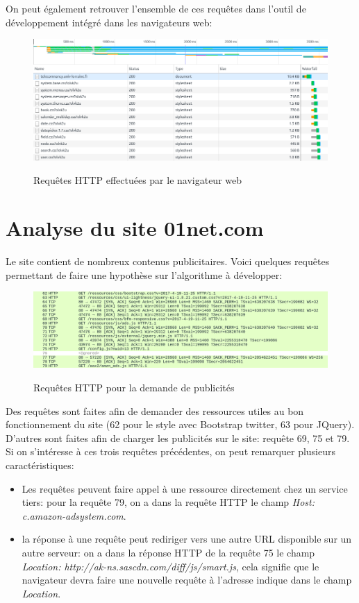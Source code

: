 \documentclass[a4paper,11pt, oneside]{book}
\def\widthImage{1}
\begin{document}
		On peut également retrouver l'ensemble de ces requêtes dans l'outil de développement intégré dans les navigateurs web:

		\begin{figure} [htbp]
			\centering
			\includegraphics[width=\widthImage\textwidth]{3.png}\\
			\caption{Requêtes HTTP effectuées par le navigateur web}
		\end{figure}


	\clearpage
	\section{Analyse du site 01net.com}
		Le site contient de nombreux contenus publicitaires. Voici quelques requêtes permettant
		de faire une hypothèse sur l'algorithme à développer:

		\begin{figure} [htbp]
			\centering
			\includegraphics[width=\widthImage\textwidth]{4.png}\\
			\caption{Requêtes HTTP pour la demande de publicités}
		\end{figure}

		Des requêtes sont faites afin de demander des ressources utiles au bon fonctionnement du site (62 pour le style avec Bootstrap twitter, 63 pour JQuery).
		D'autres sont faites afin de charger les publicités sur le site: requête 69, 75 et 79.
		Si on s'intéresse à ces trois requêtes précédentes, on peut remarquer plusieurs caractéristiques:
		\begin{itemize}
			\item Les requêtes peuvent faire appel à une ressource directement chez un service tiers: pour la requête 79,
			on a dans la requête HTTP le champ  \textit{Host: c.amazon-adsystem.com}.
			\item la réponse à une requête peut rediriger vers une autre URL disponible sur un autre serveur:
			on a dans la réponse HTTP de la requête 75 le champ \textit{Location: http://ak-ns.sascdn.com/diff/js/smart.js}, cela
			signifie que le navigateur devra faire une nouvelle requête à l'adresse indique dans le champ \textit{Location}.
		\end{itemize}
\end{document}
